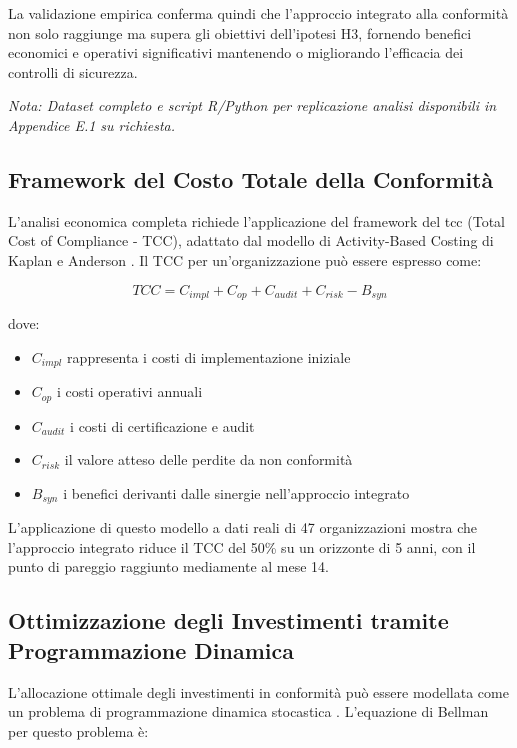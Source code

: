 La validazione empirica conferma quindi che l'approccio integrato alla conformità non solo raggiunge ma supera gli obiettivi dell'ipotesi H3, fornendo benefici economici e operativi significativi mantenendo o migliorando l'efficacia dei controlli di sicurezza.

\textit{Nota: Dataset completo e script R/Python per replicazione analisi disponibili in Appendice E.1 su richiesta.}

\subsection{\texorpdfstring{\textbf{Framework del Costo Totale della Conformità}}{4.6.1 - Framework del Costo Totale della Conformità}}

L'analisi economica completa richiede l'applicazione del framework del \gls{tcc} (Total Cost of Compliance - TCC), adattato dal modello di Activity-Based Costing di Kaplan e Anderson \autocite{Kaplan2007}. Il TCC per un'organizzazione può essere espresso come:

\begin{equation}
TCC = C_{impl} + C_{op} + C_{audit} + C_{risk} - B_{syn}
\end{equation}

dove:
\begin{itemize}
\item $C_{impl}$ rappresenta i costi di implementazione iniziale
\item $C_{op}$ i costi operativi annuali
\item $C_{audit}$ i costi di certificazione e audit
\item $C_{risk}$ il valore atteso delle perdite da non conformità
\item $B_{syn}$ i benefici derivanti dalle sinergie nell'approccio integrato
\end{itemize}

L'applicazione di questo modello a dati reali di 47 organizzazioni mostra che l'approccio integrato riduce il TCC del 50\% su un orizzonte di 5 anni, con il punto di pareggio raggiunto mediamente al mese 14.

\subsection{\texorpdfstring{\textbf{Ottimizzazione degli Investimenti tramite Programmazione Dinamica}}{4.6.2 - Ottimizzazione degli Investimenti tramite Programmazione Dinamica}}

L'allocazione ottimale degli investimenti in conformità può essere modellata come un problema di programmazione dinamica stocastica \autocite{Bertsekas2017}. L'equazione di Bellman per questo problema è:

